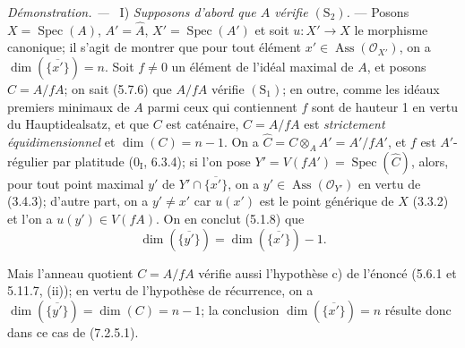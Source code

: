 \documentclass[10pt,oneside]{book}
\newenvironment{proof}{%
  \par\medskip\noindent\textit{Démonstration. ---\ }}{\par}
\begin{document}
\begin{proof}
\medskip\noindent
I) \emph{Supposons d'abord que $A$ vérifie $(\mathrm S_2)$.} --- Posons
$X=\operatorname{Spec}(A)$, $A'=\widehat A$,
$X'=\operatorname{Spec}(A')$ et soit $u:X'\to X$ le morphisme canonique;
il s'agit de montrer que pour tout élément
$x'\in\operatorname{Ass}(\mathscr O_{X'})$, on a
$\dim(\overline{\{x'\}})=n$. Soit $f\neq0$ un élément de l'idéal maximal
de $A$, et posons $C=A/fA$; on sait (5.7.6) que $A/fA$ vérifie
$(\mathrm S_1)$; en outre, comme les idéaux premiers minimaux de $A$ parmi
ceux qui contiennent $f$ sont de hauteur 1 en vertu du Hauptidealsatz, et
que $C$ est caténaire, $C=A/fA$ est \emph{strictement équidimensionnel} et
$\dim(C)=n-1$. On a
$\widehat C=C\otimes_AA'=A'/fA'$, et $f$ est $A'$-régulier par platitude
(0$_{\mathrm I}$, 6.3.4); si l'on pose
$Y'=V(fA')=\operatorname{Spec}(\widehat C)$, alors, pour tout point maximal
$y'$ de $Y'\cap\overline{\{x'\}}$, on a
$y'\in\operatorname{Ass}(\mathscr O_{Y'})$ en vertu de (3.4.3); d'autre
part, on a $y'\neq x'$ car $u(x')$ est le point générique de $X$ (3.3.2)
et l'on a $u(y')\in V(fA)$. On en conclut (5.1.8) que
\begin{equation}
\dim(\overline{\{y'\}})=\dim(\overline{\{x'\}})-1.
\tag{7.2.5.1}
\label{IV.2.eq.7.2.5.1-fr}
\end{equation}

Mais l'anneau quotient $C=A/fA$ vérifie aussi l'hypothèse c) de l'énoncé
(5.6.1 et 5.11.7, (ii)); en vertu de l'hypothèse de récurrence, on a
$\dim(\overline{\{y'\}})=\dim(C)=n-1$; la conclusion
$\dim(\overline{\{x'\}})=n$ résulte donc dans ce cas de (7.2.5.1).


\end{proof}
\end{document}
